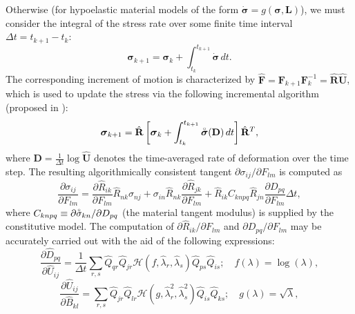 	Otherwise (for hypoelastic material models of the form $\dot{\boldsymbol{\sigma}} = g(\boldsymbol{\sigma}, \mathbf{L})$), we must consider the integral of the stress rate over some finite time interval $\Delta t = t_{k+1} - t_{k}$:
	\begin{equation}
		\boldsymbol{\sigma}_{k+1} = \boldsymbol{\sigma}_k + \int_{t_{k}}^{t_{k+1}} \dot{\boldsymbol{\sigma}} \, dt.
	\end{equation}
	The corresponding increment of motion is characterized by $\hat{\mathbf{F}} = \mathbf{F}_{k+1} \mathbf{F}^{-1}_{k} = \hat{\mathbf{R}} \hat{\mathbf{U}}$, which is used to update the stress via the following incremental algorithm (proposed in \cite{Rashid:93}):
	\begin{equation}
		\boldsymbol{\sigma}_{k+1} = \hat{\mathbf{R}} \left[ \boldsymbol{\sigma}_k + \int_{t_k}^{t_{k+1}} \accentset{\circ}{\boldsymbol{\sigma}} (\mathbf{D}) \, dt \right] \hat{\mathbf{R}}^T,
	\end{equation}
	where $\mathbf{D} = \frac{1}{\Delta t} \log \hat{\mathbf{U}}$ denotes the time-averaged rate of deformation over the time step. The resulting algorithmically consistent tangent $\partial \sigma_{ij} / \partial F_{lm}$ is computed as
	\begin{equation}
		\frac{\partial \sigma_{ij}}{\partial F_{lm}} = \frac{\partial \hat{R}_{ik}}{\partial F_{lm}} \hat{R}_{nk} \sigma_{nj} + \sigma_{in} \hat{R}_{nk} \frac{\partial \hat{R}_{jk}}{\partial F_{lm}} + \hat{R}_{ik} C_{knpq} \hat{R}_{jn} \frac{\partial D_{pq}}{\partial F_{lm}} \Delta t,
	\end{equation}
	where $C_{knpq} \equiv \partial \accentset{\circ}{\sigma}_{kn} / \partial D_{pq}$ (the material tangent modulus) is supplied by the constitutive model. The computation of $\partial \hat{R}_{ik} / \partial F_{lm}$ and $\partial D_{pq} / \partial F_{lm}$ may be accurately carried out with the aid of the following expressions:
	\begin{equation}
		\frac{\partial \hat{D}_{pq}}{\partial \hat{U}_{ij}} = \frac{1}{\Delta t} \sum_{r,s} \hat{Q}_{qr} \hat{Q}_{jr} \mathcal{H} (f, \hat{\lambda}_r, \hat{\lambda}_s) \hat{Q}_{ps} \hat{Q}_{is}; \quad f (\lambda) = \log (\lambda),
	\end{equation}
	\begin{equation}
		\frac{\partial \hat{U}_{ij}}{\partial \hat{B}_{kl}} = \sum_{r,s} \hat{Q}_{jr} \hat{Q}_{lr} \mathcal{H} (g, \hat{\lambda}_r^2, \hat{\lambda}_s^2) \hat{Q}_{is} \hat{Q}_{ks}; \quad g (\lambda) = \sqrt{\lambda},
	\end{equation}
